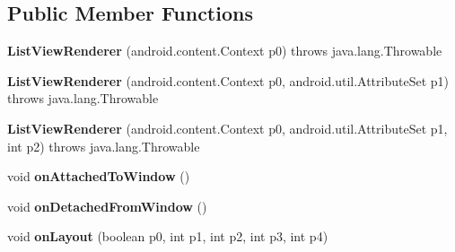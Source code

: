 \subsection*{Public Member Functions}
\begin{DoxyCompactItemize}
\item 
\hypertarget{classmd5282f1122c1313907b9bf274dd2c2f344_1_1ListViewRenderer_ad70e33a52e7d29d66874dad39b4f114b}{}{\bfseries List\+View\+Renderer} (android.\+content.\+Context p0)  throws java.\+lang.\+Throwable 	\label{classmd5282f1122c1313907b9bf274dd2c2f344_1_1ListViewRenderer_ad70e33a52e7d29d66874dad39b4f114b}

\item 
\hypertarget{classmd5282f1122c1313907b9bf274dd2c2f344_1_1ListViewRenderer_a1961e5ebb1db33e7fc3ca8289fd45b15}{}{\bfseries List\+View\+Renderer} (android.\+content.\+Context p0, android.\+util.\+Attribute\+Set p1)  throws java.\+lang.\+Throwable 	\label{classmd5282f1122c1313907b9bf274dd2c2f344_1_1ListViewRenderer_a1961e5ebb1db33e7fc3ca8289fd45b15}

\item 
\hypertarget{classmd5282f1122c1313907b9bf274dd2c2f344_1_1ListViewRenderer_abc433baeaa5d71750f8d0a4b9a0586fb}{}{\bfseries List\+View\+Renderer} (android.\+content.\+Context p0, android.\+util.\+Attribute\+Set p1, int p2)  throws java.\+lang.\+Throwable 	\label{classmd5282f1122c1313907b9bf274dd2c2f344_1_1ListViewRenderer_abc433baeaa5d71750f8d0a4b9a0586fb}

\item 
\hypertarget{classmd5282f1122c1313907b9bf274dd2c2f344_1_1ListViewRenderer_a5be5904a5b2be0baa3ad513ad6526ebd}{}void {\bfseries on\+Attached\+To\+Window} ()\label{classmd5282f1122c1313907b9bf274dd2c2f344_1_1ListViewRenderer_a5be5904a5b2be0baa3ad513ad6526ebd}

\item 
\hypertarget{classmd5282f1122c1313907b9bf274dd2c2f344_1_1ListViewRenderer_ab8512fdb859145319d79725ed0857856}{}void {\bfseries on\+Detached\+From\+Window} ()\label{classmd5282f1122c1313907b9bf274dd2c2f344_1_1ListViewRenderer_ab8512fdb859145319d79725ed0857856}

\item 
\hypertarget{classmd5282f1122c1313907b9bf274dd2c2f344_1_1ListViewRenderer_a98811ba536045f4e6755297501b36a85}{}void {\bfseries on\+Layout} (boolean p0, int p1, int p2, int p3, int p4)\label{classmd5282f1122c1313907b9bf274dd2c2f344_1_1ListViewRenderer_a98811ba536045f4e6755297501b36a85}


\end{DoxyCompactItemize}
